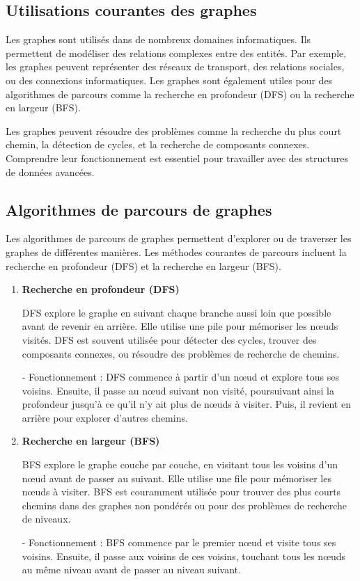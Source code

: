 \subsection{Utilisations courantes des graphes}
Les graphes sont utilisés dans de nombreux domaines informatiques. Ils permettent de modéliser des relations complexes entre des entités. Par exemple, les graphes peuvent représenter des réseaux de transport, des relations sociales, ou des connexions informatiques. Les graphes sont également utiles pour des algorithmes de parcours comme la recherche en profondeur (DFS) ou la recherche en largeur (BFS).

Les graphes peuvent résoudre des problèmes comme la recherche du plus court chemin, la détection de cycles, et la recherche de composants connexes. Comprendre leur fonctionnement est essentiel pour travailler avec des structures de données avancées.

\subsection{Algorithmes de parcours de graphes}

Les algorithmes de parcours de graphes permettent d'explorer ou de traverser les graphes de différentes manières. Les méthodes courantes de parcours incluent la recherche en profondeur (DFS) et la recherche en largeur (BFS).

\begin{enumerate}[label=\alph*)]
	\item \textbf{Recherche en profondeur (DFS)}
	
	DFS explore le graphe en suivant chaque branche aussi loin que possible avant de revenir en arrière. Elle utilise une pile pour mémoriser les nœuds visités. DFS est souvent utilisée pour détecter des cycles, trouver des composants connexes, ou résoudre des problèmes de recherche de chemins.
	
	- Fonctionnement : DFS commence à partir d'un nœud et explore tous ses voisins. Ensuite, il passe au nœud suivant non visité, poursuivant ainsi la profondeur jusqu'à ce qu'il n'y ait plus de nœuds à visiter. Puis, il revient en arrière pour explorer d'autres chemins.
	
	\item \textbf{Recherche en largeur (BFS)}
	
	BFS explore le graphe couche par couche, en visitant tous les voisins d'un nœud avant de passer au suivant. Elle utilise une file pour mémoriser les nœuds à visiter. BFS est couramment utilisée pour trouver des plus courts chemins dans des graphes non pondérés ou pour des problèmes de recherche de niveaux.
	
	- Fonctionnement : BFS commence par le premier nœud et visite tous ses voisins. Ensuite, il passe aux voisins de ces voisins, touchant tous les nœuds au même niveau avant de passer au niveau suivant.
	
\end{enumerate}

